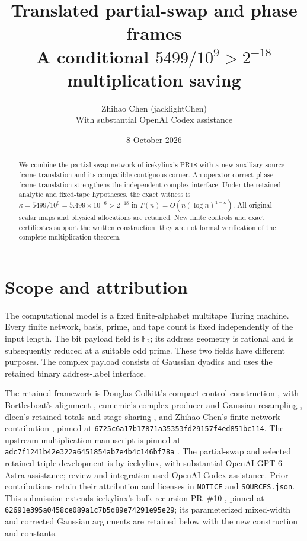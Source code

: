 \documentclass[11pt]{article}
\title{Translated partial-swap and phase frames\\
\large A conditional $5499/10^9>2^{-18}$ multiplication saving}
\author{Zhihao Chen (jacklightChen)\\\small With substantial OpenAI Codex assistance}
\date{8 October 2026}
\begin{document}
\maketitle
\begin{abstract}
We combine the partial-swap network of icekylinx's PR18 with a new
auxiliary source-frame translation and its compatible contiguous corner.
An operator-correct phase-frame translation strengthens the independent
complex interface. Under the retained analytic and fixed-tape hypotheses,
the exact witness is $\kappa=5499/10^9=5.499\times10^{-6}>2^{-18}$ in
$T(n)=O(n(\log n)^{1-\kappa})$. All original scalar maps and physical
allocations are retained. New finite controls and exact certificates
support the written construction; they are not formal verification of
the complete multiplication theorem.
\end{abstract}

\section{Scope and attribution}
The computational model is a fixed finite-alphabet multitape Turing machine.
Every finite network, basis, prime, and tape count is fixed independently of
the input length. The bit payload field is $\mathbb F_2$; its address
geometry is rational and is subsequently reduced at a suitable odd prime.
These two fields have different purposes. The complex payload consists of
Gaussian dyadics and uses the retained binary address-label interface.

The retained framework is Douglas Colkitt's compact-control construction
\cite{main}, with Bortlesboat's alignment \cite{pr2}, eumemic's complex
producer and Gaussian resampling \cite{pr3,pr5,pr6}, dleen's retained totals
and stage sharing \cite{pr4}, and Zhihao Chen's finite-network contribution
\cite{pr7}, pinned at
\texttt{6725c6a17b17871a35353fd29157f4ed851bc114}.
The upstream multiplication manuscript is pinned at
\texttt{adc7f1241b42e322a6451854ab7e4b4c146bf78a} \cite{upstream}.
The partial-swap and selected retained-triple development is by icekylinx,
with substantial OpenAI GPT-6 Astra assistance; review and integration used
OpenAI Codex assistance. Prior contributions retain their attribution and
licenses in \texttt{NOTICE} and \texttt{SOURCES.json}.
This submission extends icekylinx's bulk-recursion PR~\#10 \cite{pr10},
pinned at \texttt{62691e395a0458ce089a1c7b5d89e74291e95e29}; its
parameterized mixed-width and corrected Gaussian arguments are retained
below with the new construction and constants.
\end{document}
